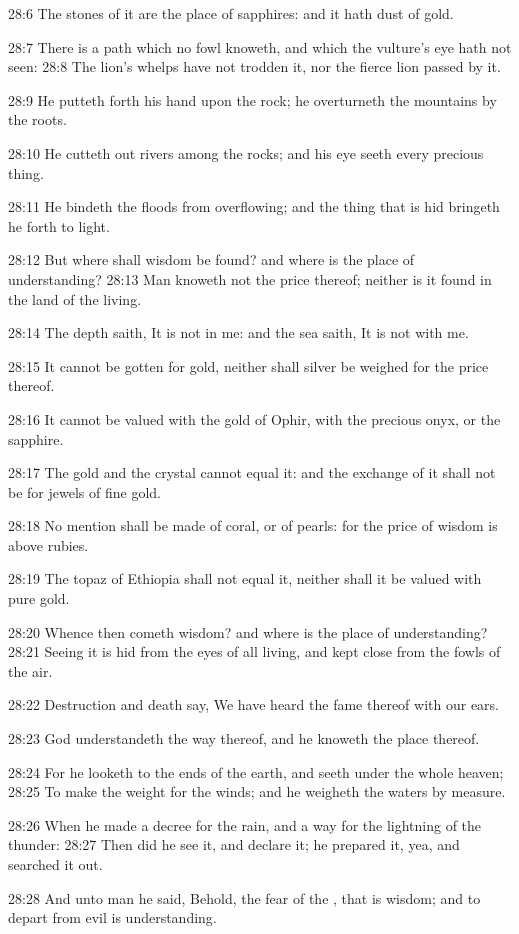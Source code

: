 28:6 The stones of it are the place of sapphires: and it hath dust of gold.

28:7 There is a path which no fowl knoweth, and which the vulture's eye hath not seen: 28:8 The lion's whelps have not trodden it, nor the fierce lion passed by it.

28:9 He putteth forth his hand upon the rock; he overturneth the mountains by the roots.

28:10 He cutteth out rivers among the rocks; and his eye seeth every precious thing.

28:11 He bindeth the floods from overflowing; and the thing that is hid bringeth he forth to light.

28:12 But where shall wisdom be found? and where is the place of understanding?  28:13 Man knoweth not the price thereof; neither is it found in the land of the living.

28:14 The depth saith, It is not in me: and the sea saith, It is not with me.

28:15 It cannot be gotten for gold, neither shall silver be weighed for the price thereof.

28:16 It cannot be valued with the gold of Ophir, with the precious onyx, or the sapphire.

28:17 The gold and the crystal cannot equal it: and the exchange of it shall not be for jewels of fine gold.

28:18 No mention shall be made of coral, or of pearls: for the price of wisdom is above rubies.

28:19 The topaz of Ethiopia shall not equal it, neither shall it be valued with pure gold.

28:20 Whence then cometh wisdom? and where is the place of understanding?  28:21 Seeing it is hid from the eyes of all living, and kept close from the fowls of the air.

28:22 Destruction and death say, We have heard the fame thereof with our ears.

28:23 God understandeth the way thereof, and he knoweth the place thereof.

28:24 For he looketh to the ends of the earth, and seeth under the whole heaven; 28:25 To make the weight for the winds; and he weigheth the waters by measure.

28:26 When he made a decree for the rain, and a way for the lightning of the thunder: 28:27 Then did he see it, and declare it; he prepared it, yea, and searched it out.

28:28 And unto man he said, Behold, the fear of the \LORD, that is wisdom; and to depart from evil is understanding.

